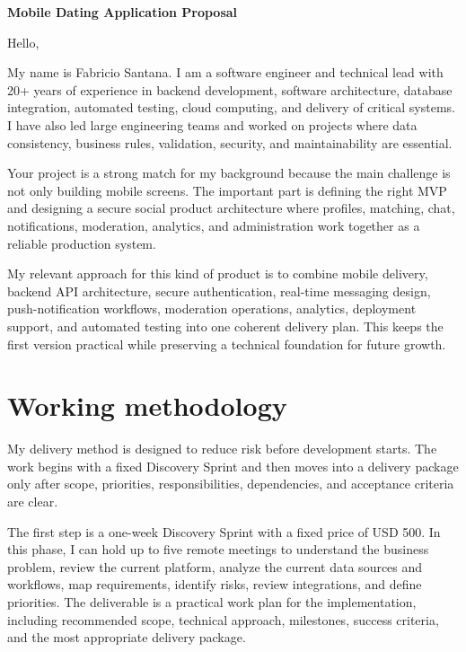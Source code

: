 \documentclass[11pt,a4paper]{article}
\begin{document}
\begin{center}
{\LARGE\bfseries Mobile Dating Application Proposal}
\end{center}
\vspace{0.5em}

Hello,\par

My name is Fabricio Santana. I am a software engineer and technical lead with 20+ years of experience in backend development, software architecture, database integration, automated testing, cloud computing, and delivery of critical systems. I have also led large engineering teams and worked on projects where data consistency, business rules, validation, security, and maintainability are essential.\par

Your project is a strong match for my background because the main challenge is not only building mobile screens. The important part is defining the right MVP and designing a secure social product architecture where profiles, matching, chat, notifications, moderation, analytics, and administration work together as a reliable production system.\par

My relevant approach for this kind of product is to combine mobile delivery, backend API architecture, secure authentication, real-time messaging design, push-notification workflows, moderation operations, analytics, deployment support, and automated testing into one coherent delivery plan. This keeps the first version practical while preserving a technical foundation for future growth.\par

\section*{Working methodology}

My delivery method is designed to reduce risk before development starts. The work begins with a fixed Discovery Sprint and then moves into a delivery package only after scope, priorities, responsibilities, dependencies, and acceptance criteria are clear.\par

The first step is a one-week Discovery Sprint with a fixed price of USD 500. In this phase, I can hold up to five remote meetings to understand the business problem, review the current platform, analyze the current data sources and workflows, map requirements, identify risks, review integrations, and define priorities. The deliverable is a practical work plan for the implementation, including recommended scope, technical approach, milestones, success criteria, and the most appropriate delivery package.\par
\end{document}
